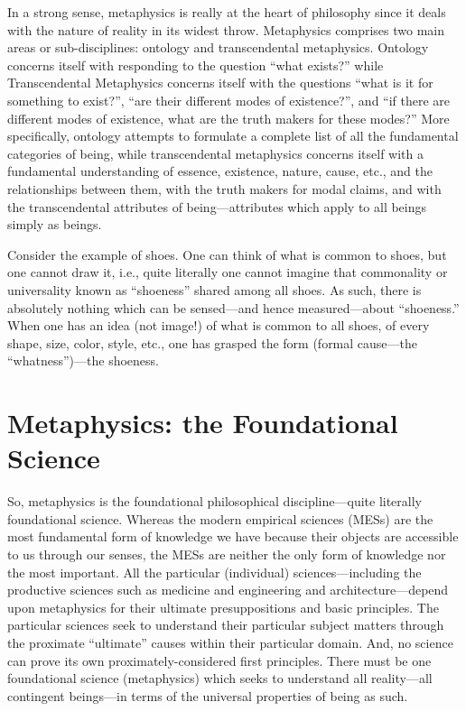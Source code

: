 In a strong sense, metaphysics is really at the heart of philosophy since it deals with the nature of reality in its widest throw. Metaphysics comprises two main areas or sub-disciplines: ontology and transcendental metaphysics. Ontology concerns itself with responding to the question ``what exists?'' while Transcendental Metaphysics concerns itself with the questions ``what is it for something to exist?'', ``are their different modes of existence?'', and ``if there are different modes of existence, what are the truth makers for these modes?'' More specifically, ontology attempts to formulate a complete list of all the fundamental categories of being, while transcendental metaphysics concerns itself with a fundamental understanding of essence, existence, nature, cause, etc., and the relationships between them, with the truth makers for modal claims, and with the transcendental attributes of being---attributes which apply to all beings simply as beings.

Consider the example of shoes. One can think of what is common to shoes, but one cannot draw it, i.e., quite literally one cannot imagine that commonality or universality known as ``shoeness'' shared among all shoes. As such, there is absolutely nothing which can be sensed---and hence measured---about ``shoeness.'' When one has an idea (not image!) of what is common to all shoes, of every shape, size, color, style, etc., one has grasped  the form (formal cause---the ``whatness'')---the shoeness.

\section{Metaphysics: the Foundational Science}

So, metaphysics is the foundational philosophical discipline---quite literally  foundational science. Whereas the modern empirical sciences (MESs) are the most fundamental form of knowledge we have because their objects are accessible to us through our senses, the MESs are neither the only form of knowledge nor the most important. All the particular (individual) sciences---including the productive sciences such as medicine and engineering and architecture---depend upon metaphysics for their ultimate presuppositions and basic principles. The particular sciences seek to understand their particular subject matters through the proximate ``ultimate'' causes within their particular domain. And, no science can prove its own proximately-considered first principles. There must be one foundational science (metaphysics) which seeks to understand all reality---all contingent beings---in terms of the universal properties of being as such.

